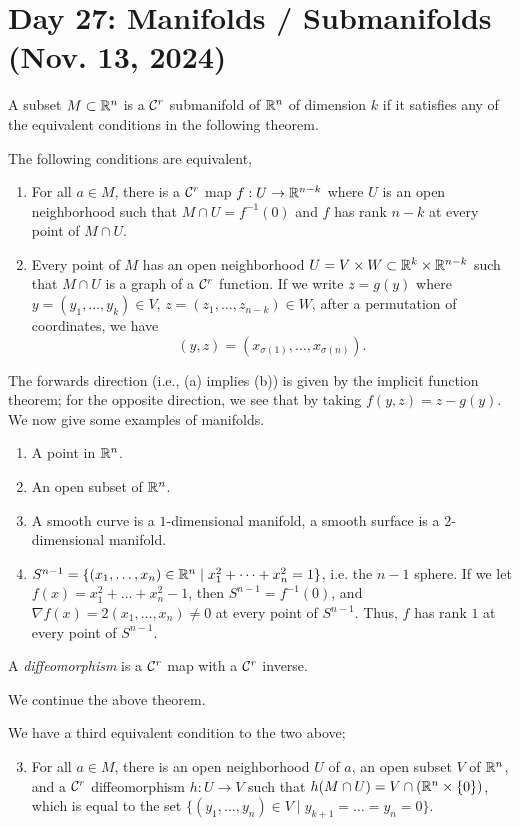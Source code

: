 \section{Day 27: Manifolds / Submanifolds (Nov. 13, 2024)}
A subset $M \subset \mathbb R^n$ is a $\mathcal C^r$ submanifold of $\mathbb R^n$ of dimension $k$ if it satisfies any of the equivalent conditions in the following theorem.
\begin{simplethm}
    The following conditions are equivalent,
    \begin{enumerate}[label=(\alph*)]
        \item For all $a \in M$, there is a $\mathcal C^r$ map $f : U \to \mathbb R^{n-k}$ where $U$ is an open neighborhood such that $M \cap U = f^{-1}(0)$ and $f$ has rank $n-k$ at every point of $M \cap U$.
        \item Every point of $M$ has an open neighborhood $U = V \times W \subset \mathbb R^{k} \times \mathbb R^{n-k}$ such that $M \cap U$ is a graph of a $\mathcal C^r$ function. If we write $z = g(y)$ where $y = (y_1, \dots, y_k) \in V$, $z = (z_1, \dots, z_{n-k}) \in W$, after a permutation of coordinates, we have
        \[ (y, z) = (x_{\sigma(1)}, \dots, x_{\sigma(n)}). \]
    \end{enumerate}
\end{simplethm}
\noindent The forwards direction (i.e., (a) implies (b)) is given by the implicit function theorem; for the opposite direction, we see that by taking $f(y, z) = z - g(y)$.
\medskip\newline
We now give some examples of manifolds.
\begin{enumerate}[label=(\alph*)]
    \item A point in $\mathbb R^n$.
    \item An open subset of $\mathbb R^n$.
    \item A smooth curve is a $1$-dimensional manifold, a smooth surface is a $2$-dimensional manifold.
    \item $S^{n-1} = \{(x_1, \dots, x_n) \in \mathbb R^n \mid x_1^2 + \dots + x_n^2 = 1\}$, i.e. the $n-1$ sphere. If we let $f(x) = x_1^2 + \dots + x_n^2 - 1$, then $S^{n-1} = f^{-1}({0})$, and $\nabla f(x) = 2(x_1, \dots, x_n) \neq 0$ at every point of $S^{n-1}$. Thus, $f$ has rank $1$ at every point of $S^{n-1}$.
\end{enumerate}
\begin{definition}
    A \textit{diffeomorphism} is a $\mathcal C^r$ map with a $\mathcal C^r$ inverse.
\end{definition}
\noindent We continue the above theorem.
\begin{simplethm}
    We have a third equivalent condition to the two above;
    \begin{enumerate}[label=(\alph*)]
        \setcounter{enumi}{2}
        \item For all $a \in M$, there is an open neighborhood $U$ of $a$, an open subset $V$ of $\mathbb R^n$, and a $\mathcal C^r$ diffeomorphism $h : U \to V$ such that $h(M \cap U) = V \cap (\mathbb R^n \times \{0\})$, which is equal to the set $\{(y_1, \dots, y_n) \in V \mid y_{k+1} = \dots = y_n = 0 \}$.
    \end{enumerate}
\end{simplethm}
